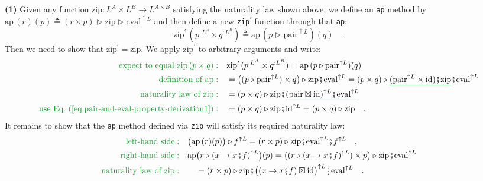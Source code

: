 \textbf{(1)} Given any function $\text{zip}:L^{A}\times L^{B}\rightarrow L^{A\times B}$
satisfying the naturality law shown above, we define an \lstinline!ap!
method by $\text{ap}\,(r)(p)\triangleq(r\times p)\triangleright\text{zip}\triangleright\text{eval}^{\uparrow L}$
and then define a new \lstinline!zip!$^{\prime}$ function through
that \lstinline!ap!:
\[
\text{zip}^{\prime}\,(p^{:L^{A}}\times q^{:L^{B}})\triangleq\text{ap}\,(p\triangleright\text{pair}^{\uparrow L})(q)\quad.
\]
Then we need to show that $\text{zip}^{\prime}=\text{zip}$. We apply
$\text{zip}^{\prime}$ to arbitrary arguments and write:
\begin{align*}
{\color{greenunder}\text{expect to equal }\text{zip}\,(p\times q):}\quad & \text{zip}^{\prime}\,(p^{:L^{A}}\times q^{:L^{B}})=\text{ap}\,(p\triangleright\text{pair}^{\uparrow L})(q)\\
{\color{greenunder}\text{definition of }\text{ap}:}\quad & =\big((p\triangleright\text{pair}^{\uparrow L})\times q\big)\triangleright\text{zip}\bef\text{eval}^{\uparrow L}=(p\times q)\triangleright\gunderline{(\text{pair}^{\uparrow L}\times\text{id})\bef\text{zip}}\bef\text{eval}^{\uparrow L}\\
{\color{greenunder}\text{naturality law of }\text{zip}:}\quad & =(p\times q)\triangleright\text{zip}\bef\gunderline{(\text{pair}\boxtimes\text{id})^{\uparrow L}\bef\text{eval}^{\uparrow L}}\\
{\color{greenunder}\text{use Eq.~(\ref{eq:pair-and-eval-property-derivation1})}:}\quad & =(p\times q)\triangleright\text{zip}\bef\text{id}^{\uparrow L}=(p\times q)\triangleright\text{zip}\quad.
\end{align*}
It remains to show that the \lstinline!ap! method defined via \lstinline!zip!
will satisfy its required naturality law:
\begin{align*}
{\color{greenunder}\text{left-hand side}:}\quad & \big(\text{ap}\,(r)(p)\big)\triangleright f^{\uparrow L}=(r\times p)\triangleright\text{zip}\bef\text{eval}^{\uparrow L}\bef f^{\uparrow L}\quad,\\
{\color{greenunder}\text{right-hand side}:}\quad & \text{ap}\big(r\triangleright(x\rightarrow x\bef f)^{\uparrow L}\big)(p)=\big((r\triangleright(x\rightarrow x\bef f)^{\uparrow L})\times p\big)\triangleright\text{zip}\bef\text{eval}^{\uparrow L}\\
{\color{greenunder}\text{naturality law of }\text{zip}:}\quad & \quad=(r\times p)\triangleright\text{zip}\bef\big((x\rightarrow x\bef f)\boxtimes\text{id}\big)^{\uparrow L}\bef\text{eval}^{\uparrow L}\quad.
\end{align*}
